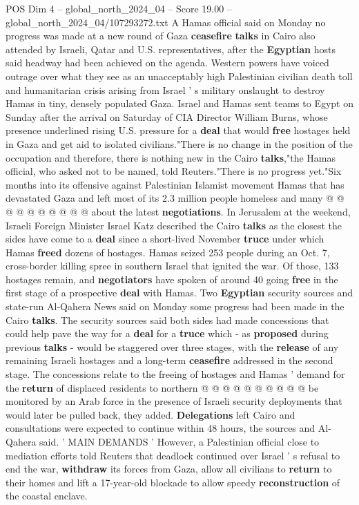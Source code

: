 \begin{textsample}{POS Dim 4 – global\_north\_2024\_04 – Score 19.00 – global\_north\_2024\_04/107293272.txt}  \label{ex:f4_pos_365}
A Hamas official said on Monday no progress was made at a new round of Gaza \textbf{ceasefire} \textbf{talks} in Cairo also attended by Israeli, Qatar and U.S. representatives, after the \textbf{Egyptian} hosts said headway had been achieved on the agenda.
Western powers have voiced outrage over what they see as an unacceptably high Palestinian civilian death toll and humanitarian crisis arising from Israel ' s military onslaught to destroy Hamas in tiny, densely populated Gaza.
Israel and Hamas sent teams to Egypt on Sunday after the arrival on Saturday of CIA Director William Burns, whose presence underlined rising U.S. pressure for a \textbf{deal} that would \textbf{free} hostages held in Gaza and get aid to isolated civilians."There is no change in the position of the occupation and therefore, there is nothing new in the Cairo \textbf{talks},"the Hamas official, who asked not to be named, told Reuters."There is no progress yet."Six months into its offensive against Palestinian Islamist movement Hamas that has devastated Gaza and left most of its 2.3 million people homeless and many @ @ @ @ @ @ @ @ @ @ about the latest \textbf{negotiations}.
In Jerusalem at the weekend, Israeli Foreign Minister Israel Katz described the Cairo \textbf{talks} as the closest the sides have come to a \textbf{deal} since a short-lived November \textbf{truce} under which Hamas \textbf{freed} dozens of hostages.
Hamas seized 253 people during an Oct. 7, cross-border killing spree in southern Israel that ignited the war.
Of those, 133 hostages remain, and \textbf{negotiators} have spoken of around 40 going \textbf{free} in the first stage of a prospective \textbf{deal} with Hamas.
Two \textbf{Egyptian} security sources and state-run Al-Qahera News said on Monday some progress had been made in the Cairo \textbf{talks}.
The security sources said both sides had made concessions that could help pave the way for a \textbf{deal} for a \textbf{truce} which - as \textbf{proposed} during previous \textbf{talks} - would be staggered over three stages, with the \textbf{release} of any remaining Israeli hostages and a long-term \textbf{ceasefire} addressed in the second stage.
The concessions relate to the freeing of hostages and Hamas ' demand for the \textbf{return} of displaced residents to northern @ @ @ @ @ @ @ @ @ @ be monitored by an Arab force in the presence of Israeli security deployments that would later be pulled back, they added. \textbf{Delegations} left Cairo and consultations were expected to continue within 48 hours, the sources and Al-Qahera said. ' MAIN DEMANDS ' However, a Palestinian official close to mediation efforts told Reuters that deadlock continued over Israel ' s refusal to end the war, \textbf{withdraw} its forces from Gaza, allow all civilians to \textbf{return} to their homes and lift a 17-year-old blockade to allow speedy \textbf{reconstruction} of the coastal enclave.

\end{textsample}
